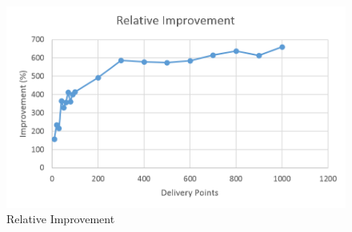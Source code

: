 \documentclass[a4paper]{article}
\begin{document}
        \begin{figure}[!h]
            \centering
            \includegraphics[width=\textwidth]{images/relimprov.png}
            \caption{Relative Improvement}
        \end{figure}
        
\end{document}
